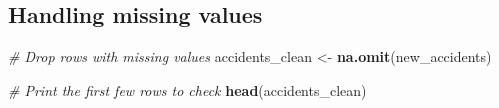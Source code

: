 \documentclass[
]{article}
\newenvironment{Shaded}{\begin{snugshade}}{\end{snugshade}}
\newcommand{\CommentTok}[1]{\textcolor[rgb]{0.56,0.35,0.01}{\textit{#1}}}
\newcommand{\FunctionTok}[1]{\textcolor[rgb]{0.13,0.29,0.53}{\textbf{#1}}}
\newcommand{\NormalTok}[1]{#1}
\newcommand{\OtherTok}[1]{\textcolor[rgb]{0.56,0.35,0.01}{#1}}
\begin{document}
\hypertarget{handling-missing-values}{%
\subsection{Handling missing values}\label{handling-missing-values}}

\begin{Shaded}
\begin{Highlighting}[]
\CommentTok{\# Drop rows with missing values}
\NormalTok{accidents\_clean }\OtherTok{\textless{}{-}} \FunctionTok{na.omit}\NormalTok{(new\_accidents)}

\CommentTok{\# Print the first few rows to check}
\FunctionTok{head}\NormalTok{(accidents\_clean)}
\end{Highlighting}
\end{Shaded}
\end{document}
